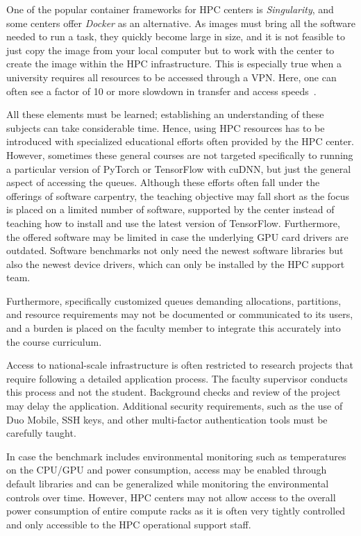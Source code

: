 One of the popular container frameworks for HPC centers is {\em Singularity}, and some centers offer {\em Docker} as an alternative. As images must bring all the software needed to run a task, they quickly become large in size, and it is not feasible to just copy the image from your local computer but to work with the center to create the image within the HPC infrastructure. This is especially true when a university requires all resources to be accessed through a VPN. Here, one can often see a factor of 10 or more slowdown in transfer and access speeds~\cite{tovar}.

All these elements must be learned; establishing an understanding of these subjects can take considerable time. Hence, using HPC resources has to be introduced with specialized educational efforts often provided by the HPC center. However, sometimes these general courses are not targeted specifically to running a particular version of PyTorch or TensorFlow with cuDNN, but just the general aspect of accessing the queues. Although these efforts often fall under the offerings of software carpentry, the teaching objective may fall short as the focus is placed on a limited number of software, supported by the center instead of teaching how to install and use the latest version of TensorFlow. Furthermore, the offered software may be limited in case the underlying GPU card drivers are outdated. Software benchmarks not only need the newest software libraries but also the newest device drivers, which can only be installed by the HPC support team.

Furthermore, specifically customized queues demanding allocations, partitions, and resource requirements may not be documented or communicated to its users, and a burden is placed on the faculty member to integrate this accurately into the course curriculum.

Access to national-scale infrastructure is often restricted to research projects that require following a detailed application process. The faculty supervisor conducts this process and not the student. Background checks and review of the project may delay the application. Additional security requirements, such as the use of Duo Mobile, SSH keys, and other multi-factor authentication tools must be carefully taught.

In case the benchmark includes environmental monitoring such as temperatures on the CPU/GPU and power consumption, access may be enabled through default libraries and can be generalized while monitoring the environmental controls over time. However, HPC centers may not allow access to the overall power consumption of entire compute racks as it is often very tightly controlled and only accessible to the HPC operational support staff.

